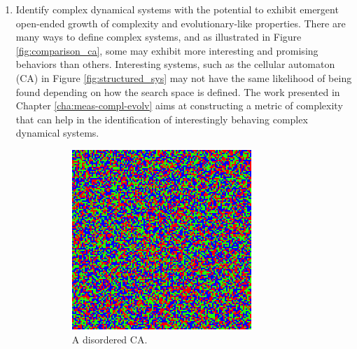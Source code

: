 \begin{enumerate}
  \item Identify complex dynamical systems with the potential to exhibit
        emergent open-ended growth of complexity and evolutionary-like
        properties. There are many ways to define complex systems, and as
        illustrated in Figure \ref{fig:comparison_ca}, some may exhibit more
        interesting and promising behaviors than others. Interesting systems,
        such as the cellular automaton (CA) in Figure \ref{fig:structured_sys}
        may not have the same likelihood of being found depending on how the
        search space is defined. The work presented in Chapter
        \ref{cha:meas-compl-evolv} aims at constructing a metric of complexity
        that can help in the identification of interestingly behaving complex
        dynamical systems.
\begin{figure}[htbp]
  \centering
\begin{subfigure}[t]{.4\linewidth}
  \centering
  \includegraphics[width=\linewidth]{figures/disord2.png}
  \caption{A disordered \acl{CA}.}
 \label{fig:disordered_sys}
\end{subfigure}
\hspace{30pt}
\begin{subfigure}[t]{.4\linewidth}
  \centering

\end{subfigure}
\end{figure}
\end{enumerate}
